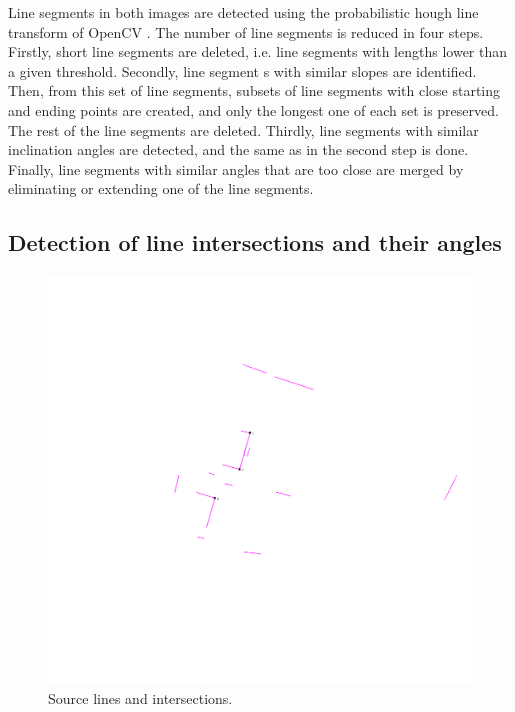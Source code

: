             Line segments in both images are detected using the probabilistic hough line transform of OpenCV \cite{opencv_library}.
            The number of line segments is reduced in four steps. 
            Firstly, short line segments are deleted, i.e. line segments with lengths lower than a given threshold.
            Secondly, line segment s with similar slopes are identified. 
            Then, from this set of line segments, subsets of line segments with close starting and ending points are created,
            and only the longest one of each set is preserved. The rest of the line segments are deleted.
            Thirdly, line segments with similar inclination angles are detected, and the same as in the second step is done.
            Finally, line segments with similar angles that are too close are merged by eliminating or extending one of the line segments.

        \subsection{Detection of line intersections and their angles}
            \begin{figure}[H]
                \includegraphics[width=\textwidth]{images/solution_images/source_intersections_inverted.png}
                \caption{Source lines and intersections.}
                \label{fig:source_intersections}
            \end{figure}

